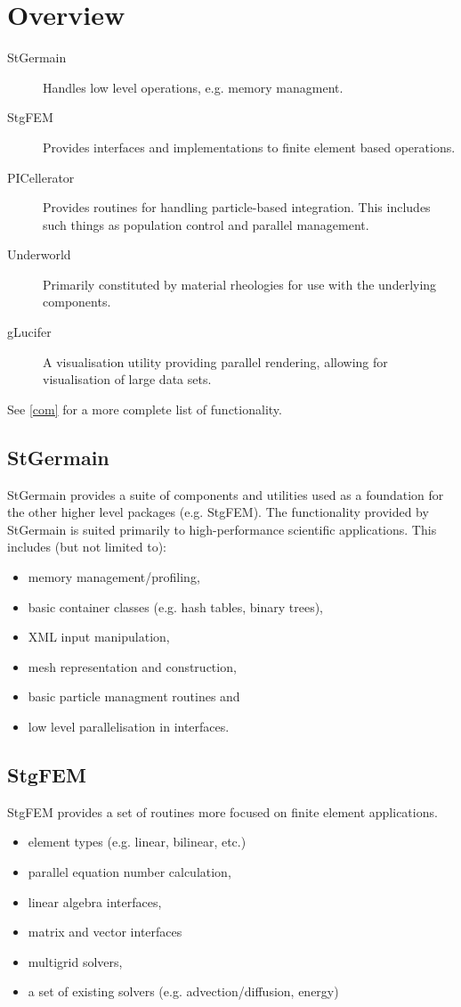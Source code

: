 \documentclass[a4paper,12pt]{article}
\date{}
\begin{document}
\section{Overview}
\label{ov}
\begin{description}
\item [StGermain] Handles low level operations, e.g. memory managment.
\item [StgFEM] Provides interfaces and implementations to finite element based
  operations.
\item [PICellerator] Provides routines for handling particle-based integration.
  This includes such things as population control and parallel management.
\item [Underworld] Primarily constituted by material rheologies for use with
  the underlying components.
\item [gLucifer] A visualisation utility providing parallel rendering, allowing
  for visualisation of large data sets.
\end{description}
See \ref{com} for a more complete list of functionality.

\subsection{StGermain}
\label{ov:stgermain}
StGermain provides a suite of components and utilities used as a foundation for
the other higher level packages (e.g. StgFEM). The functionality provided by
StGermain is suited primarily to high-performance scientific applications. This
includes (but not limited to):
\begin{itemize}
\item memory management/profiling, 
\item basic container classes (e.g. hash tables, binary trees), 
\item XML input manipulation, 
\item mesh representation and construction, 
\item basic particle managment routines and
\item low level parallelisation in interfaces.
\end{itemize}

\subsection{StgFEM}
\label{ov:stgfem}
StgFEM provides a set of routines more focused on finite element applications.
\begin{itemize}
\item element types (e.g. linear, bilinear, etc.)
\item parallel equation number calculation, 
\item linear algebra interfaces, 
\item matrix and vector interfaces
\item multigrid solvers, 
\item a set of existing solvers (e.g. advection/diffusion, energy)
\end{itemize}
\end{document}
